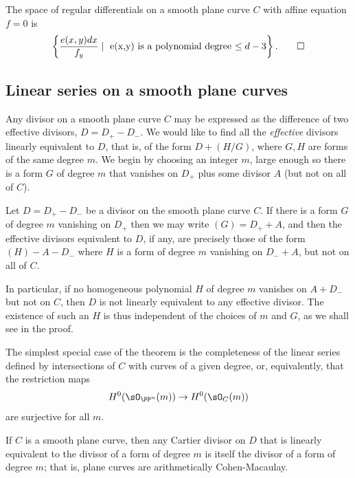 \begin{theorem}
The space of regular differentials on a smooth plane curve $C$
with affine equation $f=0$ is 
$$
\left\{ \frac{e(x,y)dx}{f_{y}} \mid \hbox{ e(x,y) is a polynomial degree $\leq d-3$}\right\}.\qed
 $$
\end{theorem}

\subsection{Linear series on a smooth plane curves}\label{linear series on smooth plane curves}

Any divisor on a smooth plane curve $C$ may be expressed as the difference of
two effective divisors, $D= D_{+}-D_{-}$. We would like to find all the \emph{effective} divisors linearly equivalent to $D$, that is, of the form
$D + (H/G)$, where $G, H$ are forms of the same degree $m$. We begin by choosing
an integer $m$, large enough so there is a form $G$ of degree $m$ that vanishes on $D_{+}$ plus some divisor $A$ (but not on all of $C$). 

\begin{theorem}\label{equiv on smooth plane curve}
Let $D= D_{+}-D_{-}$ be a divisor on the smooth plane curve $C$. If
there is a form $G$ of degree $m$ vanishing on $D_{+}$
then we may write $(G) = D_{+}+A$, and then
the effective divisors equivalent to $D$, if any, are precisely those 
of the form $(H) - A -D_{-}$ where $H$
is a form of degree $m$ vanishing on $D_{-}+A$, but not on all of $C$.
\end{theorem}

In particular, if no homogeneous polynomial $H$ of degree $m$ vanishes on  $A + D_{-}$ but not on $C$, then $D$ is not linearly equivalent to any effective divisor. The existence of such an $H$ is thus independent of the choices of $m$ and $G$, as we shall see in the proof.

The simplest special case of the theorem is the completeness of the linear series defined
by intersections of $C$ with curves of a given degree, 
or, equivalently, that the restriction maps
$$
H^{0}(\sO_{\PP^{n}}(m)) \to H^{0}(\sO_{C}(m))
$$
are surjective for all $m$. 

\begin{proposition}\label {completeness of hyperplanes on plane curve}
If $C$ is a smooth plane curve, then any Cartier divisor on $D$ that is linearly equivalent to the divisor of
a form of degree $m$ is itself the divisor of a form of degree $m$; that is, plane curves are
arithmetically Cohen-Macaulay.
\end{proposition}

